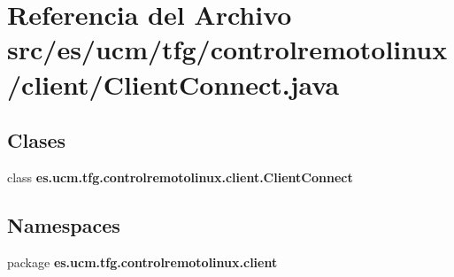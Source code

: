 \section{Referencia del Archivo src/es/ucm/tfg/controlremotolinux/client/\-Client\-Connect.java}
\label{ClientConnect_8java}
\subsection*{Clases}
\begin{DoxyCompactItemize}
\item 
class {\bf es.\-ucm.\-tfg.\-controlremotolinux.\-client.\-Client\-Connect}
\end{DoxyCompactItemize}
\subsection*{Namespaces}
\begin{DoxyCompactItemize}
\item 
package {\bf es.\-ucm.\-tfg.\-controlremotolinux.\-client}
\end{DoxyCompactItemize}
